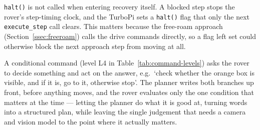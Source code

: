 \texttt{halt()} is not called when entering recovery itself. A blocked step stops the rover's
step-timing clock, and the TurboPi sets a \texttt{halt()} flag that only the next
\texttt{execute\_step} call clears. This matters because the free-roam approach
(Section~\ref{ssec:freeroam}) calls the drive commands directly, so a flag left set could
otherwise block the next approach step from moving at all.



%

A conditional command (level L4 in Table~\ref{tab:command-levels}) asks the rover to decide
something and act on the answer, e.g.\ `check whether the orange box is visible, and if it is,
go to it, otherwise stop'. The planner writes both branches up front, before anything moves,
and the rover evaluates only the one condition that matters at the time — letting the planner
do what it is good at, turning words into a structured plan, while leaving the single judgement
that needs a camera and vision model to the point where it actually matters.

%

